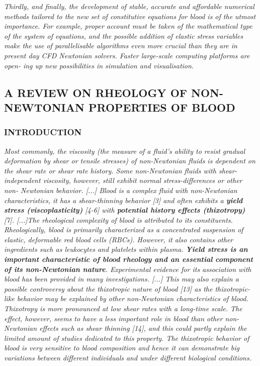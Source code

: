 \documentclass[11pt,letterpaper]{article}
\begin{document}
\textit{Thirdly, and finally, the development of stable, accurate and affordable numerical methods tailored to the new set of constitutive equations for blood is of the utmost importance. For example, proper account must be taken of the mathematical type of the system of equations, and the possible addition of elastic stress variables make the use of parallelisable algorithms even more crucial than they are in present day CFD Newtonian solvers. Faster large-scale computing platforms are open- ing up new possibilities in simulation and visualisation.}


\newpage
\subsection{A REVIEW ON RHEOLOGY OF NON-NEWTONIAN PROPERTIES OF BLOOD}
\subsubsection*{INTRODUCTION}
\textit{Most commonly, the viscosity (the measure of a fluid's ability to resist gradual deformation by shear or tensile stresses) of non-Newtonian fluids is dependent on the shear rate or shear rate history. Some non-Newtonian fluids with shear- independent viscosity, however, still exhibit normal stress-differences or other non- Newtonian behavior. [...] \newline\newline Blood is a complex fluid with non-Newtonian characteristics, it has a shear-thinning behavior [3] and often exhibits a  \textbf{yield stress (viscoplasticity)} [4-6] with  \textbf{potential history effects (thixotropy) }[7]. [...]The rheological complexity of blood is attributed to its constituents. Rheologically, blood is primarily characterized as a concentrated suspension of elastic, deformable red blood cells (RBCs). However, it also contains other ingredients such as leukocytes and platelets within plasma. \textbf{Yield stress is an important characteristic of blood rheology and an essential component of its non-Newtonian nature}. Experimental evidence for its association with blood has been provided in many investigations. [...] \newline  \newline This may also explain a possible controversy about the thixotropic nature of blood [13] as the thixotropic-like behavior may be explained by other non-Newtonian characteristics of blood. Thixotropy is more pronounced at low shear rates with a long-time scale. The effect, however, seems to have a less important role in blood than other non-Newtonian effects such as shear thinning [14], and this could partly explain the limited amount of studies dedicated to this property. The thixotropic behavior of blood is very sensitive to blood composition and hence it can demonstrate big variations between different individuals and under different biological conditions. }
\end{document}
